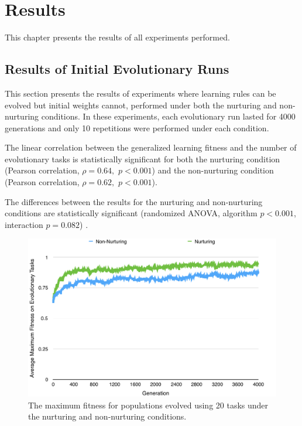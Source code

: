\documentclass[master]{outhesis}
\begin{document}
\chapter{Results}

This chapter presents the results of all experiments performed.

\section{Results of Initial Evolutionary Runs}

This section presents the results of experiments where learning rules can be evolved but initial weights cannot, performed under both the nurturing and non-nurturing conditions.
In these experiments, each evolutionary run lasted for 4000 generations and only 10 repetitions were performed under each condition.

The linear correlation between the generalized learning fitness and the number of evolutionary tasks is statistically significant for both
the nurturing condition (Pearson correlation, $\rho=0.64,$ $p < 0.001$)
and the non-nurturing condition (Pearson correlation, $\rho=0.62,$ $p < 0.001$).

The differences between the results for the nurturing and non-nurturing conditions are statistically significant (randomized ANOVA, algorithm $p < 0.001$, interaction $p = 0.082$) \cite{Piater:1998aa}.

\begin{figure}[H]
	\centering
	\includegraphics{ChalmersEvolution.pdf}
	\caption{The maximum fitness for populations evolved using 20 tasks under the nurturing and non-nurturing conditions.}
	\label{fig:ChalmersEvolution}
\end{figure}
\end{document}

